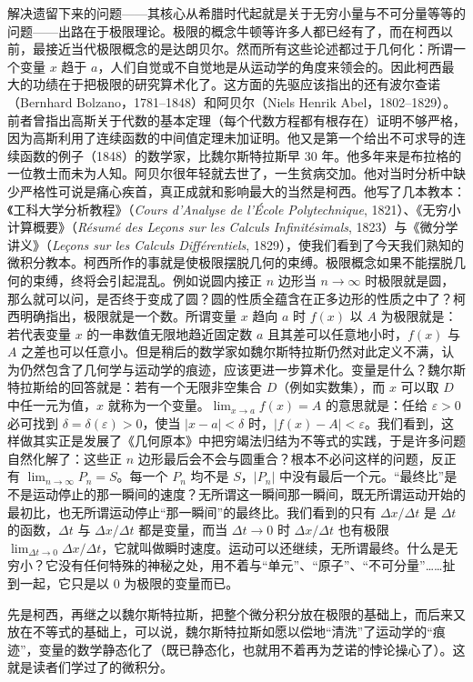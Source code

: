 解决遗留下来的问题——其核心从希腊时代起就是关于无穷小量与不可分量等等的问题——出路在于极限理论。极限的概念牛顿等许多人都已经有了，而在柯西以前，最接近当代极限概念的是达朗贝尔。然而所有这些论述都过于几何化：所谓一个变量 $x$ 趋于 $a$，人们自觉或不自觉地是从运动学的角度来领会的。因此柯西最大的功绩在于把极限的研究算术化了。这方面的先驱应该指出的还有波尔查诺（Bernhard Bolzano，1781--1848）和阿贝尔（Niels Henrik Abel，1802--1829）。前者曾指出高斯关于代数的基本定理（每个代数方程都有根存在）证明不够严格，因为高斯利用了连续函数的中间值定理未加证明。他又是第一个给出不可求导的连续函数的例子（1848）的数学家，比魏尔斯特拉斯早 30 年。他多年来是布拉格的一位教士而未为人知。阿贝尔很年轻就去世了，一生贫病交加。他对当时分析中缺少严格性可说是痛心疾首，真正成就和影响最大的当然是柯西。他写了几本教本：《工科大学分析教程》（\textit{Cours d'Analyse de l'École Polytechnique}, 1821）、《无穷小计算概要》（\textit{Résumé des Leçons sur les Calculs Infinitésimals}, 1823）与《微分学讲义》（\textit{Leçons sur les Calculs Différentiels}, 1829），使我们看到了今天我们熟知的微积分教本。柯西所作的事就是使极限摆脱几何的束缚。极限概念如果不能摆脱几何的束缚，终将会引起混乱。例如说圆内接正 $n$ 边形当 $n\to\infty$ 时极限就是圆，那么就可以问，是否终于变成了圆？圆的性质全蕴含在正多边形的性质之中了？柯西明确指出，极限就是一个数。所谓变量 $x$ 趋向 $a$ 时 $f(x)$ 以 $A$ 为极限就是：若代表变量 $x$ 的一串数值无限地趋近固定数 $a$ 且其差可以任意地小时，$f(x)$ 与 $A$ 之差也可以任意小。但是稍后的数学家如魏尔斯特拉斯仍然对此定义不满，认为仍然包含了几何学与运动学的痕迹，应该更进一步算术化。变量是什么？魏尔斯特拉斯给的回答就是：若有一个无限非空集合 $D$（例如实数集），而 $x$ 可以取 $D$ 中任一元为值，$x$ 就称为一个变量。$\lim_{x\to a}f(x)=A$ 的意思就是：任给 $\varepsilon>0$ 必可找到 $\delta=\delta(\varepsilon)>0$，使当 $|x-a|<\delta$ 时，$|f(x)-A|<\varepsilon$。我们看到，这样做其实正是发展了《几何原本》中把穷竭法归结为不等式的实践，于是许多问题自然化解了：这些正 $n$ 边形最后会不会与圆重合？根本不必问这样的问题，反正有 $\lim_{n\to\infty}P_n=S$。每一个 $P_n$ 均不是 $S$，$|P_n|$ 中没有最后一个元。“最终比”是不是运动停止的那一瞬间的速度？无所谓这一瞬间那一瞬间，既无所谓运动开始的最初比，也无所谓运动停止“那一瞬间”的最终比。我们看到的只有 $\Delta x/\Delta t$ 是 $\Delta t$ 的函数，$\Delta t$ 与 $\Delta x/\Delta t$ 都是变量，而当 $\Delta t\to0$ 时 $\Delta x/\Delta t$ 也有极限 $\lim_{\Delta t\to0}\Delta x/\Delta t$，它就叫做瞬时速度。运动可以还继续，无所谓最终。什么是无穷小？它没有任何特殊的神秘之处，用不着与“单元”、“原子”、“不可分量”……扯到一起，它只是以 $0$ 为极限的变量而已。

先是柯西，再继之以魏尔斯特拉斯，把整个微分积分放在极限的基础上，而后来又放在不等式的基础上，可以说，魏尔斯特拉斯如愿以偿地“清洗”了运动学的“痕迹”，变量的数学静态化了（既已静态化，也就用不着再为芝诺的悖论操心了）。这就是读者们学过了的微积分。

